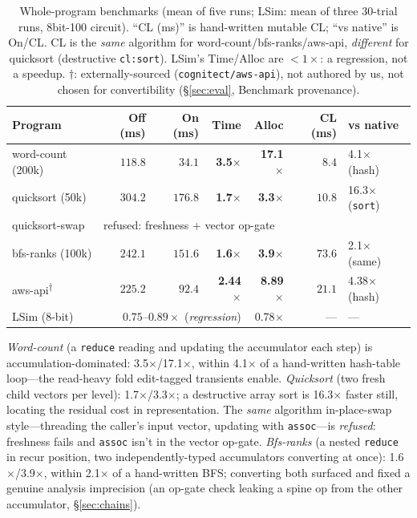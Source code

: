 \documentclass[sigplan,review,anonymous]{acmart}
\begin{document}
\begin{table}[h]
  \caption{Whole-program benchmarks (mean of five runs; LSim: mean of three 30-trial runs, 8bit-100 circuit). ``CL (ms)'' is hand-written mutable CL; ``vs native'' is On/CL. CL is the \emph{same} algorithm for word-count/bfs-ranks/aws-api, \emph{different} for quicksort (destructive \texttt{cl:sort}). LSim's Time/Alloc are $<1\times$: a regression, not a speedup. $\dagger$: externally-sourced (\texttt{cognitect/aws-api}), not authored by us, not chosen for convertibility (§\ref{sec:eval}, Benchmark provenance).}
  \label{tab:programs}
  \footnotesize
  \setlength{\tabcolsep}{2pt}
  \begin{tabular}{@{}lrrrrrl@{}}
    \toprule
    Program & Off (ms) & On (ms) & Time & Alloc & CL (ms) & vs native \\
    \midrule
    word-count (200k) & $118.8$ & $34.1$ & \textbf{3.5$\times$} & \textbf{17.1$\times$} & $8.4$ & 4.1$\times$ (hash) \\
    quicksort (50k)   & $304.2$ & $176.8$ & \textbf{1.7$\times$} & \textbf{3.3$\times$} & $10.8$ & 16.3$\times$ (\texttt{sort}) \\
    quicksort-swap    & \multicolumn{6}{l}{refused: freshness + vector op-gate} \\
    bfs-ranks (100k)  & $242.1$ & $151.6$ & \textbf{1.6$\times$} & \textbf{3.9$\times$} & $73.6$ & 2.1$\times$ (same) \\
    aws-api\textsuperscript{$\dagger$} & $225.2$ & $92.4$ & \textbf{2.44$\times$} & \textbf{8.89$\times$} & $21.1$ & 4.38$\times$ (hash) \\
    LSim (8-bit)      & \multicolumn{3}{r}{$0.75$--$0.89\times$ (\emph{regression})} & 0.78$\times$ & --- & --- \\
    \bottomrule
  \end{tabular}
\end{table}

\emph{Word-count} (a \texttt{reduce} reading and updating the accumulator each step) is accumulation-dominated: 3.5$\times$/17.1$\times$, within 4.1$\times$ of a hand-written hash-table loop---the read-heavy fold edit-tagged transients enable. \emph{Quicksort} (two fresh child vectors per level): 1.7$\times$/3.3$\times$; a destructive array sort is 16.3$\times$ faster still, locating the residual cost in representation. The \emph{same} algorithm in-place-swap style---threading the caller's input vector, updating with \texttt{assoc}---is \emph{refused}: freshness fails and \texttt{assoc} isn't in the vector op-gate. \emph{Bfs-ranks} (a nested \texttt{reduce} in recur position, two independently-typed accumulators converting at once): 1.6$\times$/3.9$\times$, within 2.1$\times$ of a hand-written BFS; converting both surfaced and fixed a genuine analysis imprecision (an op-gate check leaking a spine op from the other accumulator, §\ref{sec:chains}).
\end{document}
